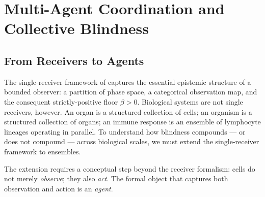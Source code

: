 
\chapter{Multi-Agent Coordination and Collective Blindness}
\label{ch:coordination}

\section{From Receivers to Agents}
\label{sec:receivers-to-agents}

The single-receiver framework of  captures the essential
epistemic structure of a bounded observer: a partition of phase space, a
categorical observation map, and the consequent strictly-positive floor
$\beta > 0$.  Biological systems are not single receivers, however.  An organ
is a structured collection of cells; an organism is a structured collection of
organs; an immune response is an ensemble of lymphocyte lineages operating in
parallel.  To understand how blindness compounds — or does not compound — across
biological scales, we must extend the single-receiver framework to ensembles.

The extension requires a conceptual step beyond the receiver formalism: cells
do not merely \emph{observe}; they also \emph{act}.  The formal object that
captures both observation and action is an \emph{agent}.

